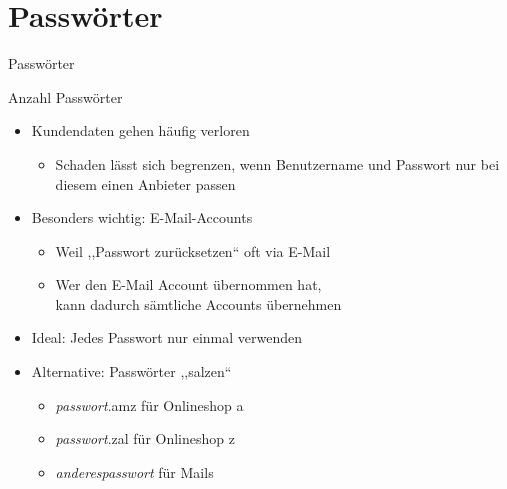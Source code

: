 \section{Passwörter}
\begin{frame}{Passwörter}


\end{frame}

\begin{frame}{Anzahl Passwörter}
  \begin{itemize}
    \item Kundendaten gehen häufig verloren
    \begin{itemize}
      \item Schaden lässt sich begrenzen, wenn Benutzername und Passwort nur bei diesem einen Anbieter passen
    \end{itemize}
    \item Besonders wichtig: E-Mail-Accounts
    \begin{itemize}
      \item Weil ,,Passwort zurücksetzen`` oft via E-Mail
      \item Wer den E-Mail Account übernommen hat,\\ kann dadurch sämtliche Accounts übernehmen
    \end{itemize}
    \item Ideal: Jedes Passwort nur einmal verwenden
    \item Alternative: Passwörter ,,salzen``
    \begin{itemize}
      \item \textit{passwort}.amz für Onlineshop a
      \item \textit{passwort}.zal für Onlineshop z
      \item \textit{anderespasswort} für Mails
    \end{itemize}
  \end{itemize}
\end{frame}

